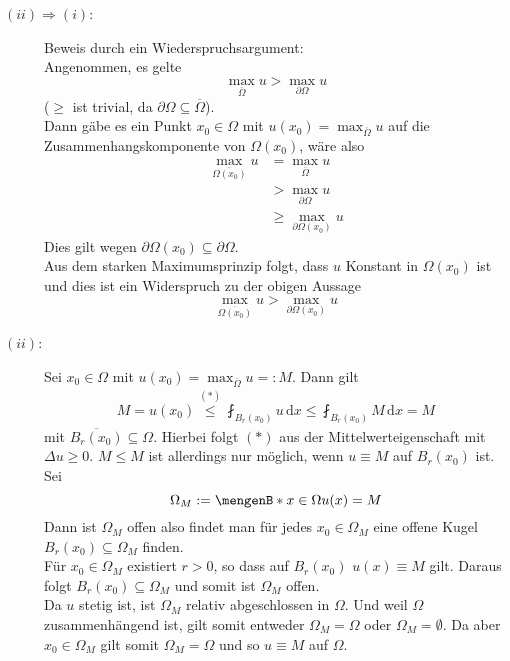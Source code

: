 \begin{beweis}
	\begin{description}
		\item[\underline{$(ii) \Rightarrow (i)$}:] Beweis durch ein Wiederspruchsargument: \\
		Angenommen, es gelte 
		\begin{equation}
			\max_{\overline{\Omega}}u > \max_{\partial \Omega} u
		\end{equation}
		($\geq$ ist trivial, da $\partial \Omega \subseteq \overline{\Omega}$). \\
		Dann gäbe es ein Punkt $x_0 \in \Omega$ mit $u(x_0) = \max_{\overline{\Omega}}u$ auf die Zusammenhangskomponente von $\Omega(x_0)$, wäre also
		\begin{align*}
			\max_{\overline{\Omega(x_0)}}u &= \max_{\overline{\Omega}}u \\
			&> \max_{\partial \Omega}u \\
			&\geq  \max_{ \partial \Omega(x_0)}u
		\end{align*}
		Dies gilt wegen $ \partial \Omega(x_0) \subseteq \partial \Omega$. \\
		Aus dem starken Maximumsprinzip folgt, dass $u$ Konstant in $\Omega(x_0)$ ist und dies ist ein Widerspruch zu der obigen Aussage
		\[
			\max_{\overline{\Omega(x_0)}}u > \max_{\partial \Omega(x_0)} u
		\]
		\item[\underline{$(ii)$}:] Sei $x_0 \in \Omega$ mit $u(x_0) = \max_{\overline{\Omega}}u =: M$. Dann gilt
		\begin{align*}
			M = u(x_0) \stackrel{(*)}{\leq } \fint_{B_r(x_0)}^{} u \,\mathrm{d}x \leq  \fint_{B_r(x_0)}^{} M \,\mathrm{d}x = M 
		\end{align*}
		mit $\overline{B_r(x_0)} \subseteq \Omega$. Hierbei folgt $(*)$ aus der Mittelwerteigenschaft mit $ \Delta u \geq 0$. $M \leq M$ ist allerdings nur möglich, 
		wenn $u \equiv M$ auf $B_r(x_0)$ ist. Sei
		\[
			\Omega_M := \set[x \in \Omega]{u(x)=M}
		\]
		Dann ist $\Omega_M$ offen also findet man für jedes $x_0 \in \Omega_M$ eine offene Kugel $B_r(x_0) \subseteq \Omega_M$ finden. \\
		Für $x_0 \in \Omega_M$ existiert $r>0$, so dass auf $B_r(x_0)$ $u(x) \equiv M$ gilt. 
		Daraus folgt $B_r(x_0) \subseteq  \Omega_M$ und somit ist $\Omega_M$ offen. \\
		Da $u$ stetig ist, ist $\Omega_M$ relativ abgeschlossen in $\Omega$. 
		Und weil $\Omega$ zusammenhängend ist, gilt somit entweder $\Omega_M = \Omega$ oder $\Omega_M = \emptyset$.
		Da aber $x_0 \in \Omega_M$ gilt somit $\Omega_M = \Omega$ und so $u \equiv M$ auf $\Omega$.
	\end{description}
\end{beweis}

